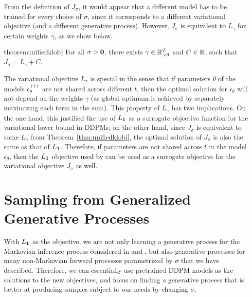 From the definition of $J_\sigma$, it would appear that a different model has to be trained for every choice of $\sigma$, since it corresponds to a different variational objective (and a different generative process). %
However, $J_\sigma$ is equivalent to $L_\gamma$ for certain weights $\gamma$, as we show below.
\begin{restatable}{theorem}{unifiedklobj}
\label{thm:unifiedklobj}
For all $\sigma > {\bm{0}}$, there exists $\gamma \in \mathbb{R}_{> 0}^{T}$ and $C \in \mathbb{R}$, such that $J_\sigma = L_\gamma + C$.
\end{restatable}
The variational objective $L_\gamma$ is special in the sense that if parameters $\theta$ %
of the models $\epsilon_\theta^{(t)}$ %
are not shared across different $t$, then the optimal solution for $\epsilon_\theta$ will not depend on the weights $\gamma$ (as global optimum is achieved by separately maximizing each term in the sum). 
This property of $L_\gamma$ has two implications. %
On the one hand, this justified the use of $L_{\bm{1}}$ as a surrogate objective function for the variational lower bound in DDPMs; on the other hand, since $J_\sigma$ is equivalent to some $L_\gamma$ from Theorem~\ref{thm:unifiedklobj}, the optimal solution of $J_\sigma$ is also the same as that of $L_{\bm{1}}$. %
Therefore, if parameters are not shared across $t$ in the model $\epsilon_\theta$, then the $L_{\bm{1}}$ objective used by \citet{ho2020denoising} can be used as a surrogate objective for the variational objective $J_\sigma$ as well. 




\section{Sampling from Generalized Generative Processes}\label{sec:sampling}
With $L_{\bm{1}}$ as the objective, we are not only learning a generative process for the Markovian inference process considered in \citet{sohl-dickstein2015deep} and \citet{ho2020denoising}, but also generative processes for many non-Markovian forward processes parametrized by $\sigma$ %
that we have described. Therefore, we can essentially use pretrained DDPM models as the solutions to the new objectives, and focus on finding a generative process that is better at producing samples subject to our needs by changing $\sigma$. %
